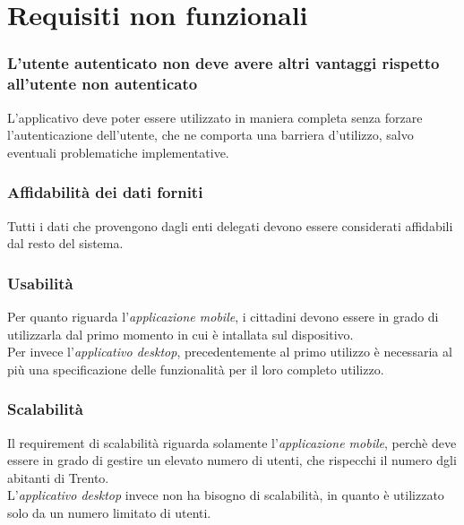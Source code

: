 \documentclass{article}
\begin{document}
\clearpage

\section{Requisiti non funzionali}

\subsubsection{L'utente autenticato non deve avere altri vantaggi rispetto all'utente non autenticato}
L'applicativo deve poter essere utilizzato in maniera completa senza forzare l'autenticazione dell'utente, che ne comporta una barriera d'utilizzo, salvo eventuali problematiche implementative.

\subsubsection{Affidabilità dei dati forniti}
Tutti i dati che provengono dagli enti delegati devono essere considerati affidabili dal resto del sistema.

\subsubsection{Usabilità}
Per quanto riguarda l'\textit{applicazione mobile}, i cittadini devono essere in grado di utilizzarla dal primo momento in cui è intallata sul dispositivo.\\
Per invece l'\textit{applicativo desktop}, precedentemente al primo utilizzo è necessaria al più una specificazione delle funzionalità per il loro completo utilizzo.

\subsubsection{Scalabilità}
Il requirement di scalabilità riguarda solamente l'\textit{applicazione mobile}, perchè deve essere in grado di gestire un elevato numero di utenti, che rispecchi il numero dgli abitanti di Trento.\\
L'\textit{applicativo desktop} invece non ha bisogno di scalabilità, in quanto è utilizzato solo da un numero limitato di utenti.
\end{document}
